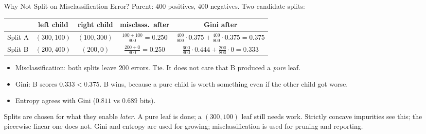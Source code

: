 \documentclass[11pt,aspectratio=169]{beamer}
\begin{document}
\begin{frame}{Why Not Split on Misclassification Error?}\small
Parent: $400$ positives, $400$ negatives. Two candidate splits:
\begin{center}
\begin{tabular}{lcccc}
\toprule
 & left child & right child & misclass.\ after & Gini after \\
\midrule
Split A & $(300,100)$ & $(100,300)$ & $\frac{100+100}{800}=0.250$ & $\frac{400}{800}\cdot0.375+\frac{400}{800}\cdot0.375=0.375$ \\[3pt]
Split B & $(200,400)$ & $(200,0)$ & $\frac{200+0}{800}=0.250$ & $\frac{600}{800}\cdot0.444+\frac{200}{800}\cdot0=0.333$ \\
\bottomrule
\end{tabular}
\end{center}
\vspace{4pt}
\begin{itemize}
  \item Misclassification: both splits leave $200$ errors. Tie. It does not care that B produced a \emph{pure} leaf.
  \item Gini: B scores $0.333<0.375$. B wins, because a pure child is worth something even if the other child got worse.
  \item Entropy agrees with Gini ($0.811$ vs $0.689$ bits).
\end{itemize}
\begin{keypoint}
Splits are chosen for what they enable \emph{later}. A pure leaf is done; a $(300,100)$ leaf still needs work.
Strictly concave impurities see this; the piecewise-linear one does not. Gini and entropy are used for growing;
misclassification is used for pruning and reporting.
\end{keypoint}
\end{frame}
\end{document}
